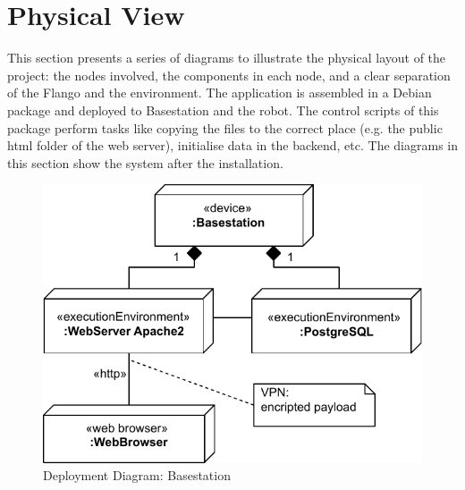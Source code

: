 \FloatBarrier

\section{Physical View}
This section presents a series of diagrams to illustrate the physical layout of the project: the nodes involved, the components in each node, and a clear separation of the Flango \cm and the environment.
The application is assembled in a Debian package and deployed to Basestation and the robot.
The control scripts of this package perform tasks like copying the files to the correct place (e.g. the public html folder of the web server), initialise data in the backend, etc.
The diagrams in this section show the system after the installation.

\begin{figure}[htb]
    \centering
    \includegraphics{figures/design-deployment-basestation.pdf}
    \caption{Deployment Diagram: Basestation}
    \label{fig:deploy-basestation}
\end{figure}

